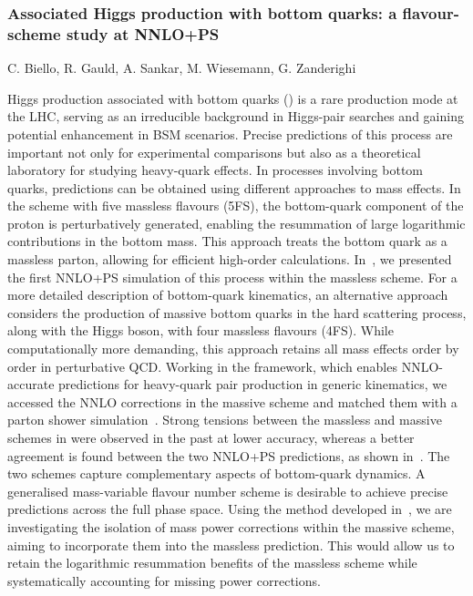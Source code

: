 \documentclass{FBR_Bericht_2025}
\begin{document}
\begin{refsection}
\subsubsection{Associated Higgs production with bottom quarks: a flavour-scheme study at NNLO+PS}
\begin{Namen}
C. Biello, R. Gauld, A. Sankar, M. Wiesemann, G. Zanderighi
\end{Namen}
Higgs production associated with bottom quarks (\bbH{}) is a rare production mode at the LHC, serving as an irreducible background in Higgs-pair searches and gaining potential enhancement in BSM scenarios. Precise predictions of this process are important not only for experimental comparisons but also as a theoretical laboratory for studying heavy-quark effects. In processes involving bottom quarks, predictions can be obtained using different approaches to mass effects. In the scheme with five massless flavours (5FS), the bottom-quark component of the proton is perturbatively generated, enabling the resummation of large logarithmic contributions in the bottom mass. This approach treats the bottom quark as a massless parton, allowing for efficient high-order calculations. In~, we presented the first NNLO+PS simulation of this process within the massless scheme. For a more detailed description of bottom-quark kinematics, an alternative approach considers the production of massive bottom quarks in the hard scattering process, along with the Higgs boson, with four massless flavours (4FS). While computationally more demanding, this approach retains all mass effects order by order in perturbative QCD. Working in the \minnlo{} framework, which enables NNLO-accurate predictions for heavy-quark pair production in generic kinematics, we accessed the NNLO corrections in the massive scheme and matched them with a parton shower simulation~\cite{Biello:2024pgo}. Strong tensions between the massless and massive schemes in \bbH{} were observed in the past at lower accuracy, whereas a better agreement is found between the two NNLO+PS predictions, as shown in~. The two schemes capture complementary aspects of bottom-quark dynamics. A generalised mass-variable flavour number scheme is desirable to achieve precise predictions across the full phase space. Using the method developed in~, we are investigating the isolation of mass power corrections within the massive scheme, aiming to incorporate them into the massless prediction. This would allow us to retain the logarithmic resummation benefits of the massless scheme while systematically accounting for missing power corrections.


\end{refsection}
\end{document}
